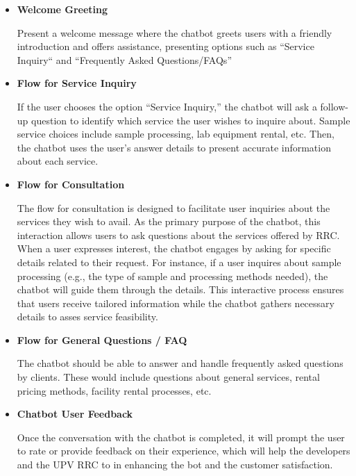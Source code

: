 \begin{itemize}
	\item \textbf{Welcome Greeting}
	
	Present a welcome message where the chatbot greets users with a friendly introduction and offers assistance, presenting options such as “Service Inquiry“ and “Frequently Asked Questions/FAQs” \newline
	
	\item \textbf{Flow for Service Inquiry}
	
	If the user chooses the option “Service Inquiry,” the chatbot will ask a follow-up question to identify which service the user wishes to inquire about. Sample service choices include sample processing,  lab equipment rental, etc. Then, the chatbot uses the user's answer details to present accurate information about each service. \newline
	
	\item \textbf{Flow for Consultation}
	
	The flow for consultation is designed to facilitate user inquiries about the services they wish to avail. As the primary purpose of the chatbot, this interaction allows users to ask questions about the services offered by RRC. When a user expresses interest, the chatbot engages by asking for specific details related to their request. For instance, if a user inquires about sample processing (e.g., the type of sample and processing methods needed), the chatbot will guide them through the details. This interactive process ensures that users receive tailored information while the chatbot gathers necessary details to asses service feasibility. \newline
	
	\item \textbf{Flow for General Questions / FAQ}
	
	The chatbot should be able to answer and handle frequently asked questions by clients. These would include questions about general services, rental pricing methods, facility rental processes, etc. \newline
	
	\item \textbf{Chatbot User Feedback}
	
	Once the conversation with the chatbot is completed, it will prompt the user to rate or provide feedback on their experience, which will help the developers and the UPV RRC to in enhancing the bot and the customer satisfaction. \newline
	

\end{itemize}
